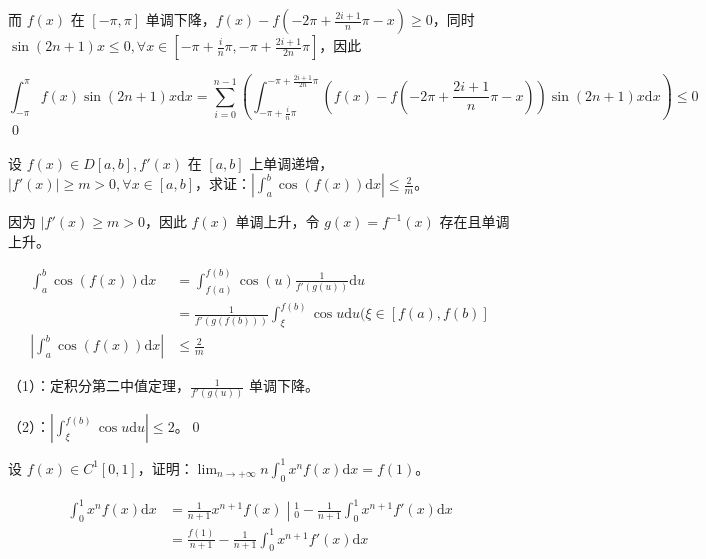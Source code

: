 而 $\displaystyle f( x)$ 在 $\displaystyle [ -\pi ,\pi ]$ 单调下降，$\displaystyle f( x) -f\left( -2\pi +\frac{2i+1}{n} \pi -x\right) \geqslant 0$，同时 $\displaystyle \sin( 2n+1) x\leqslant 0,\forall x\in \left[ -\pi +\frac{i}{n} \pi ,-\pi +\frac{2i+1}{2n} \pi \right]$，因此

\begin{equation*}
	\int _{-\pi }^{\pi } f( x)\sin( 2n+1) x\mathrm{d} x=\sum _{i=0}^{n-1}\left(\int _{-\pi +\frac{i}{n} \pi }^{-\pi +\frac{2i+1}{2n} \pi }\left( f( x) -f\left( -2\pi +\frac{2i+1}{n} \pi -x\right)\right)\sin( 2n+1) x\mathrm{d} x\right) \leqslant 0
\end{equation*}\qed 





\begin{ques}
	设 $\displaystyle f( x) \in D[ a,b] ,f'( x)$ 在 $\displaystyle [ a,b]$ 上单调递增，$\displaystyle |f'( x) |\geqslant m >0,\forall x\in [ a,b]$，求证：$\displaystyle \left| \int _{a}^{b}\cos( f( x))\mathrm{d} x\right| \leqslant \frac{2}{m}$。
\end{ques}



因为 $\displaystyle |f'( x) \geqslant m >0$，因此 $\displaystyle f( x)$ 单调上升，令 $\displaystyle g( x) =f^{-1}( x)$ 存在且单调上升。


\begin{align*}
	\int _{a}^{b}\cos( f( x))\mathrm{d} x & =\int _{f( a)}^{f( b)}\cos( u)\frac{1}{f'( g( u))}\mathrm{d} u\\
	& =\frac{1}{f'( g( f( b)))}\int _{\xi }^{f( b)}\cos u\mathrm{d} u( \xi \in [ f( a) ,f( b)]\\
	\left| \int _{a}^{b}\cos( f( x))\mathrm{d} x\right|  & \leqslant \frac{2}{m}
\end{align*}


（1）：定积分第二中值定理，$\displaystyle \frac{1}{f'( g( u))}$ 单调下降。

（2）：$\displaystyle \left| \int _{\xi }^{f( b)}\cos u\mathrm{d} u\right| \leqslant 2$。\qed 



\begin{ques}
	设 $\displaystyle f( x) \in C^{1}[ 0,1]$，证明：$\displaystyle \lim _{n\rightarrow +\infty } n\int _{0}^{1} x^{n} f( x)\mathrm{d} x=f( 1)$。
\end{ques}
\begin{align*}
	\int _{0}^{1} x^{n} f( x)\mathrm{d} x & =\left. \frac{1}{n+1} x^{n+1} f( x)\middle| _{0}^{1}\right. -\frac{1}{n+1}\int _{0}^{1} x^{n+1} f'( x)\mathrm{d} x\\
	& =\frac{f( 1)}{n+1} -\frac{1}{n+1}\int _{0}^{1} x^{n+1} f'( x)\mathrm{d} x
\end{align*}


